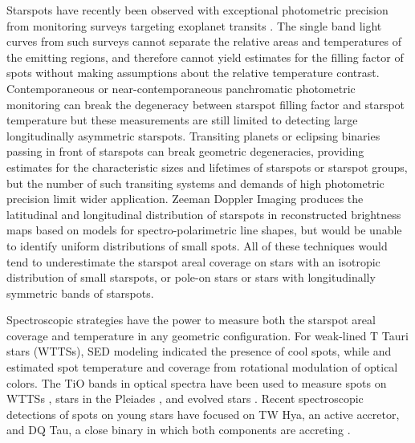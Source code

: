 \documentclass[twocolumn]{emulateapj}%
\begin{document}
Starspots have recently been observed with exceptional photometric precision from monitoring surveys targeting exoplanet transits \citep[\emph{e.g}][]{harrison11,davenport15}.  The single band light curves from such surveys cannot separate the relative areas and temperatures of the emitting regions, and therefore cannot yield estimates for the filling factor of spots without making assumptions about the relative temperature contrast. Contemporaneous or near-contemporaneous panchromatic photometric monitoring \citep{petrov94,bouvier95,grankin07,cody14} can break the degeneracy between starspot filling factor and starspot temperature but these measurements are still limited to detecting large longitudinally asymmetric starspots.  Transiting planets or eclipsing binaries passing in front of starspots \citep{desert11} can break geometric degeneracies, providing estimates for the characteristic sizes and lifetimes of starspots or starspot groups, but the number of such transiting systems and demands of high photometric precision limit wider application.  Zeeman Doppler Imaging \citep[ZDI]{donati14} produces the latitudinal and longitudinal distribution of starspots in reconstructed brightness maps based on models for spectro-polarimetric line shapes, but would be unable to identify uniform distributions of small spots.  All of these techniques would tend to underestimate the starspot areal coverage on stars with an isotropic distribution of small starspots, or pole-on stars or stars with longitudinally symmetric bands of starspots.

Spectroscopic strategies have the power to measure both the starspot areal coverage and temperature in any geometric configuration.  For weak-lined T Tauri stars (WTTSs), SED modeling \citep{wolk96} indicated the presence of cool spots, while \citet{grankin98} and \citet{venuti15} estimated spot temperature and coverage from rotational modulation of optical colors.  The TiO bands in optical spectra have been used to measure spots on WTTSs \citep{petrov94}, stars in the Pleiades \citep{fang2016}, and evolved stars \citep[e.g.][]{neff95,oneal01,oneal04}.  Recent spectroscopic detections of spots on young stars have focused on TW Hya, an active accretor, and DQ Tau, a close binary in which both components are accreting \citep{debes13,bary14}.  
\end{document}
